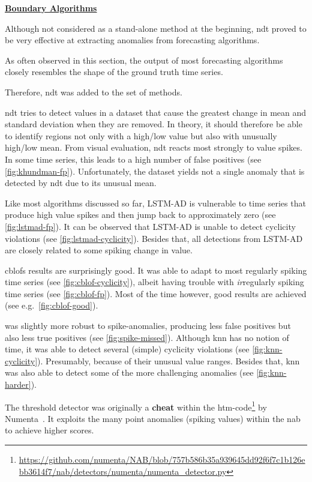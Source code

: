 \bigskip
{\large\uline{\textbf{Boundary Algorithms}}}\\
\begin{description}[style=unboxed,leftmargin=0cm]
    \item[Nonparametric Dynamic Thresholding~\cite{Hundman.2018}] Although not
    considered as a stand-alone method at the beginning, \gls{ndt} proved to be
    very effective at extracting anomalies from forecasting algorithms.
    
    As often observed in this section, the output of most forecasting algorithms
    closely resembles the shape of the ground truth time series.
    
    Therefore, \gls{ndt} was added to the set of methods.
    
    \gls{ndt} tries to detect values in a dataset that cause the greatest change
    in mean and standard deviation when they are removed. In theory, it should
    therefore be able to identify regions not only with a high/low value but also
    with unusually high/low mean. From visual evaluation, \gls{ndt} reacts most
    strongly to value spikes. In some time series, this leads to a high number
    of false positives (see \cref{fig:khundman-fp}). Unfortunately, the dataset
    yields not a single anomaly that is detected by \gls{ndt} due to its unusual
    mean.
    \item[LSTM-AD] Like most algorithms discussed so far, LSTM-AD is vulnerable
    to time series that produce high value spikes and then jump back to approximately
    zero (see \cref{fig:lstmad-fp}). It can be observed that LSTM-AD is unable to detect
    cyclicity violations (see \cref{fig:lstmad-cyclicity}). Besides that, all
    detections from LSTM-AD are closely related to some spiking change in
    value.
    \item[CBLOF] \gls{cblof}s results are surprisingly good. It was able to adapt
    to most regularly spiking time series (see \cref{fig:cblof-cyclicity}), albeit having trouble
    with \textit{ir}regularly spiking time series (see \cref{fig:cblof-fp}). Most of the
    time however, good results are achieved (see e.g.\ \cref{fig:cblof-good}).
    \item[kNN] was slightly more robust to spike-anomalies, producing
    less false positives but also less true positives (see \cref{fig:spike-missed}).
    Although \gls{knn} has no notion of time, it was able to detect several
    (simple) cyclicity violations (see \cref{fig:knn-cyclicity}). Presumably,
    because of their unusual value ranges. Besides that, \gls{knn} was also able
    to detect some of the more challenging anomalies (see \cref{fig:knn-harder}).
    \item[Threshold Detector] The threshold detector was originally a \textbf{cheat}
    within the \gls{htm}-code\footnote{\raggedright\url{https://github.com/numenta/NAB/blob/757b586b35a939645dd92f6f7c1b126ebb3614f7/nab/detectors/numenta/numenta_detector.py}}
    by Numenta~\cite{Lavin.2015,Ahmad.2017}. It exploits the many point anomalies
    (spiking values) within the \gls{nab} to achieve higher scores.
    

\end{description}

